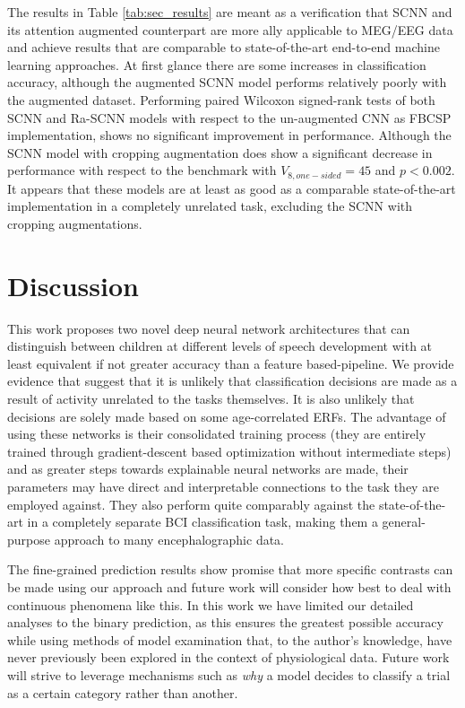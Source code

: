 \documentclass[fleqn,10pt]{wlscirep}
\begin{document}
The results in Table \ref{tab:sec_results} are meant as a verification that SCNN and its attention augmented counterpart are more ally applicable to MEG/EEG data and achieve results that are comparable to state-of-the-art end-to-end machine learning approaches. At first glance there are some increases in classification accuracy, although the augmented SCNN model performs relatively poorly with the augmented dataset. Performing paired Wilcoxon signed-rank tests of both SCNN and Ra-SCNN models with respect to the un-augmented CNN as FBCSP implementation, shows no significant improvement in performance. Although the SCNN model with cropping augmentation does show a significant decrease in performance with respect to the benchmark with $V_{8, one-sided}=45$ and $p<0.002$. It appears that these models are at least as good as a comparable state-of-the-art implementation in a completely unrelated task, excluding the SCNN with cropping augmentations.


\section*{Discussion}

This work proposes two novel deep neural network architectures that can distinguish between children at different levels of speech development with at least equivalent if not greater accuracy than a feature based-pipeline. We provide evidence that suggest that it is unlikely that classification decisions are made as a result of activity unrelated to the tasks themselves. It is also unlikely that decisions are solely made based on some age-correlated ERFs. The advantage of using these networks is their consolidated training process (they are entirely trained through gradient-descent based optimization without intermediate steps) and as greater steps towards explainable neural networks are made, their parameters may have direct and interpretable connections to the task they are employed against. They also perform quite comparably against the state-of-the-art in a completely separate BCI classification task, making them a general-purpose approach to many encephalographic data.

The fine-grained prediction results show promise that more specific contrasts can be made using our approach and future work will consider how best to deal with continuous phenomena like this. In this work we have limited our detailed analyses to the binary prediction, as this ensures the greatest possible accuracy while using methods of model examination that, to the author's knowledge, have never previously been explored in the context of physiological data. Future work will strive to leverage mechanisms such as \cite{lime, anchors} {\em why} a model decides to classify a trial as a certain category rather than another.
\end{document}
